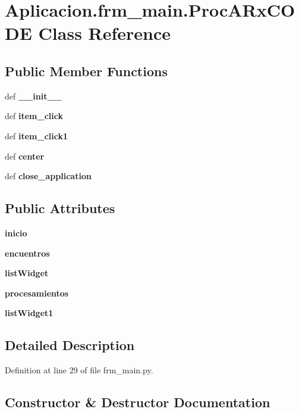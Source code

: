 \section{\-Aplicacion.\-frm\-\_\-main.\-Proc\-A\-Rx\-C\-O\-D\-E \-Class \-Reference}
\label{class_aplicacion_1_1frm__main_1_1_proc_a_rx_c_o_d_e}
\subsection*{\-Public \-Member \-Functions}
\begin{DoxyCompactItemize}
\item 
def {\bf \-\_\-\-\_\-init\-\_\-\-\_\-}
\item 
def {\bf item\-\_\-click}
\item 
def {\bf item\-\_\-click1}
\item 
def {\bf center}
\item 
def {\bf close\-\_\-application}
\end{DoxyCompactItemize}
\subsection*{\-Public \-Attributes}
\begin{DoxyCompactItemize}
\item 
{\bf inicio}
\item 
{\bf encuentros}
\item 
{\bf list\-Widget}
\item 
{\bf procesamientos}
\item 
{\bf list\-Widget1}
\end{DoxyCompactItemize}


\subsection{\-Detailed \-Description}


\-Definition at line 29 of file frm\-\_\-main.\-py.



\subsection{\-Constructor \& \-Destructor \-Documentation}
